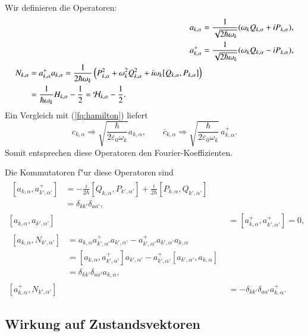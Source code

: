 \begin{refsection}
Wir definieren die Operatoren:
\begin{align*}
a_{k,\alpha} &= \frac{1}{\sqrt{2 \hbar \omega_k}} (\omega_k Q_{k,\alpha} + iP_{k,\alpha}), \\
a^+_{k,\alpha} &= \frac{1}{\sqrt{2 \hbar \omega_k}} (\omega_k Q_{k,\alpha} - iP_{k,\alpha}),\\
\begin{split}
N_{k,\alpha} &= a^+_{k,\alpha} a_{k,\alpha} = \frac{1}{2 \hbar \omega_k} \left(P_{k,\alpha}^2 + \omega_k^2 Q_{k,\alpha}^2 + i\omega_k [Q_{k,\alpha},P_{k,\alpha}] \right) \\
 &= \frac{1}{ \hbar \omega_k } H_{k,\alpha} - \frac{1}{2} = {\cal H}_{k,\alpha} - \frac{1}{2}.
\end{split}
\end{align*}
Ein Vergleich mit (\ref{fq:hamilton}) liefert
\begin{equation} \label{fq:opp_fourier}
 c_{k,\alpha} \Rightarrow \sqrt{\frac{\hbar}{2 \varepsilon_0 \omega_k}} a_{k,\alpha}, \qquad 
 \bar{c}_{k,\alpha} \Rightarrow \sqrt{\frac{\hbar}{2 \varepsilon_0 \omega_k}} \, a^+_{k,\alpha}.
\end{equation}
Somit entsprechen diese Operatoren den Fourier-Koeffizienten.

Die Kommutatoren f"ur diese Operatoren sind
\begin{align*}
\begin{split}
[a_{k,\alpha} , a^+_{k',\alpha'}] &= - \frac{i}{2 \hbar} [Q_{k,\alpha}, P_{k',\alpha'}] + \frac{i}{2 \hbar} [P_{k,\alpha}, Q_{k',\alpha'}] \\
	 &= \delta_{kk'}\delta_{aa'},
\end{split}\\
[a_{k,\alpha} , a_{k',\alpha'}] &= [a^+_{k,\alpha} , a^+_{k',\alpha'}] = 0, \\
\begin{split}
[a_{k,\alpha} , N_{k',\alpha'}] &= a_{k,\alpha} a^+_{k',\alpha'} a_{k',\alpha'} - a^+_{k',\alpha'} a_{k',\alpha'} a_{k,\alpha} \\
	&= [a_{k,\alpha} , a^+_{k',\alpha'}]a_{k',\alpha'} - a^+_{k',\alpha'}[a_{k',\alpha'} , a_{k,\alpha}]\\
	&= \delta_{kk'}\delta_{aa'} a_{k,\alpha},
\end{split} \\
[a^+_{k,\alpha} , N_{k',\alpha'}] &= -\delta_{kk'}\delta_{aa'} a^+_{k,\alpha}.
\end{align*}

\subsection{Wirkung auf Zustandsvektoren}


\end{refsection}
